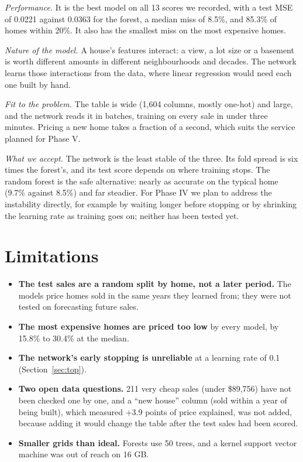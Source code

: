 \documentclass[sigconf,nonacm,10pt]{acmart}
\begin{document}
\emph{Performance.} It is the best model on all 13 scores we recorded, with a test MSE of 0.0221 against 0.0363 for the forest, a median miss of 8.5\%, and 85.3\% of homes within 20\%. It also has the smallest miss on the most expensive homes.

\emph{Nature of the model.} A house's features interact: a view, a lot size or a basement is worth different amounts in different neighbourhoods and decades. The network learns those interactions from the data, where linear regression would need each one built by hand.

\emph{Fit to the problem.} The table is wide (1,604 columns, mostly one-hot) and large, and the network reads it in batches, training on every sale in under three minutes. Pricing a new home takes a fraction of a second, which suits the service planned for Phase V.

\emph{What we accept.} The network is the least stable of the three. Its fold spread is six times the forest's, and its test score depends on where training stops. The random forest is the safe alternative: nearly as accurate on the typical home (9.7\% against 8.5\%) and far steadier. For Phase IV we plan to address the instability directly, for example by waiting longer before stopping or by shrinking the learning rate as training goes on; neither has been tested yet.

\section{Limitations}
\label{sec:limits}

\begin{itemize}
\item \textbf{The test sales are a random split by home, not a later period.} The models price homes sold in the same years they learned from; they were not tested on forecasting future sales.
\item \textbf{The most expensive homes are priced too low} by every model, by 15.8\% to 30.4\% at the median.
\item \textbf{The network's early stopping is unreliable} at a learning rate of 0.1 (Section~\ref{sec:top}).
\item \textbf{Two open data questions.} 211 very cheap sales (under \$89,756) have not been checked one by one, and a ``new house'' column (sold within a year of being built), which measured +3.9 points of price explained, was not added, because adding it would change the table after the test sales had been scored.
\item \textbf{Smaller grids than ideal.} Forests use 50 trees, and a kernel support vector machine was out of reach on 16 GB.
\end{itemize}
\end{document}
